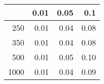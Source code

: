 % 
\begin{tabular}{rrrr}
  \hline
 & 0.01 & 0.05 & 0.1 \\ 
  \hline
250 & 0.01 & 0.04 & 0.08 \\ 
  350 & 0.01 & 0.04 & 0.08 \\ 
  500 & 0.01 & 0.05 & 0.10 \\ 
  1000 & 0.01 & 0.04 & 0.09 \\ 
   \hline
\end{tabular}
